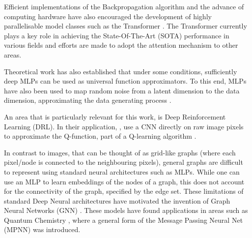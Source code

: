 \documentclass{report}
\numberwithin{equation}{section}
\numberwithin{figure}{section}
\numberwithin{table}{section}
\numberwithin{algorithm}{section}
\begin{document}
Efficient implementations \citep{PyTorch,tensorflow} 
of the Backpropagation algorithm \citep{backprop} and the 
advance of computing 
hardware have also encouraged the development of highly parallelisable 
model classes such as the Transformer \citep{transformers}. The 
Transformer currently plays a key role in achieving the 
State-Of-The-Art (SOTA) performance 
in various fields and efforts are made to adopt the attention 
mechanism to other areas.

Theoretical work \citep{UnivApproxNN} has also established
that under some conditions, sufficiently deep MLPs 
can be used as universal function approximators. To this end, 
MLPs have also been used to map random noise from a latent 
dimension to the data dimension, approximating 
the data generating process \citep{goodfellow2014generative,VAEs}.

An area that is particularly relevant for this work, 
is Deep Reinforcement Learning 
(DRL). In their application, \cite{DQN}, use a CNN directly on 
raw image pixels to approximate the Q-function, part of a 
Q-learning algorithm \citep{QlearningWatkins1992}. 

In contrast to images, that can be thought of as grid-like graphs 
(where each pixel/node is connected to the neighbouring pixels), 
general graphs are difficult to represent using standard 
neural architectures such as MLPs. While one can use an MLP 
to learn embeddings of the nodes of a graph, this does not 
account for the connectivity of the graph, specified by the edge set. 
These limitations of standard Deep Neural architectures 
have motivated the invention of Graph Neural Networks (GNN) \citep{ScarselliGNN}. 
These models have found applications in areas such as 
Quantum Chemistry \citep{MPNNs}, where 
a general form of the Message Passing Neural Net (MPNN) was 
introduced.



\end{document}
